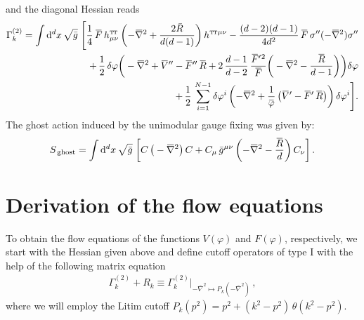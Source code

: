 \documentclass[11pt]{book}
\newcommand{\overbar}[1]{\mkern 1.5mu\overline{\mkern-1.5mu#1\mkern-1.5mu}\mkern 1.5mu}
\newcommand\TTspace{ -1pt }
\newcommand\TT{ \scriptscriptstyle{\mathrm{T\hspace{\TTspace}T}} }
\newcommand\hTTmunu{ h^{\scriptscriptstyle{\mathrm{T\hspace{\TTspace}T}}}_{\mu\nu} }
\newcommand{\bnabla}{\overbar \nabla}
\newcommand{\bR}{\overbar R}
\newcommand{\bV}{\overbar V}
\newcommand{\bF}{\overbar F}
\newcommand{\bp}{\overbar \varphi}
\newcommand{\deltap}{\delta \varphi}
\numberwithin{equation}{chapter}
\begin{document}
\begin{appendices}
\begin{align}
\end{align}
and the diagonal Hessian reads
\begin{align}
  \Gamma_k^{(2)} = \int \mathrm{d}^d x \, \sqrt{\bar{g}} \;
  \Bigg[
    \frac{1}{4} \, \bF \, \hTTmunu
    \left(
      -\bnabla^2 + \frac{2 \bar{R}}{d(d-1)}
    \right)
    h^{{\TT}\mu\nu}
    - \frac{(d-2)(d-1)}{4d^2} \, \bF \, \sigma^{\prime\prime} (-\bnabla^2) \sigma^{\prime\prime}
    \nonumber\\
    +\, \frac{1}{2} \, \deltap
    \bigg(
      - \bnabla^2 + \bV'' - \bF'' \, \bR
      + 2 \, \frac{d-1}{d-2} \, \frac{\bF'{}^2}{\bF}
      \bigg(
        -\bnabla^2 - \frac{\bR}{d-1}
      \bigg)
    \bigg) \deltap \nonumber \\
    +\,\frac{1}{2} \, \sum_{i=1}^{N-1} \deltap^i
    \left(
      -\bnabla^2 + \frac{1}{\bp} \, \big( \bV' - \bF' \, \bR \big)
    \right)
    \deltap^i
  \Bigg] .
  \label{hessfinal}
\end{align}
The ghost action induced by the unimodular gauge fixing was given by:
\begin{align}
  S_{\,\mathrm{ghost}} = \int \mathrm d^dx \, \sqrt{\bar g} \;
  \bigg[
    C \, \big( -\bnabla^2 \big) \, C
    + C_\mu \, \bar g^{\mu\nu}
    \left( -\bnabla^2-\frac{\bR}{d} \right) C_\nu
  \bigg]
  \,.
\end{align}

\section{Derivation of the flow equations}

To obtain the flow equations of the functions $V(\varphi)$
and $F(\varphi)$, respectively, we start with the Hessian given above and
define cutoff operators of type I with the help of the following matrix equation
\begin{align}
  \Gamma_k^{(2)} + R_k \equiv \Gamma_k^{(2)} \bigg|_{-\bar{\nabla}^2 \mapsto P_k(-\bar{\nabla}^2)}\,,
  \label{cutoff}
\end{align}
where we will employ the Litim cutoff $P_k(p^2) = p^2 + (k^2-p^2) \, \theta(k^2-p^2)$.


\end{appendices}
\end{document}
